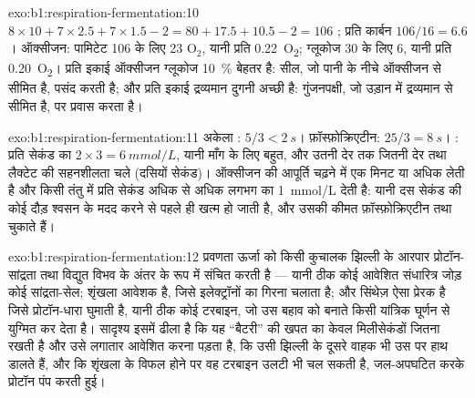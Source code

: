 \begin{solution}{exo:b1:respiration-fermentation:10}
$8\times 10 + 7\times 2.5 + 7\times 1.5 - 2 = 80 + 17.5 + 10.5 - 2 =
106$ ; प्रति कार्बन $106/16 = 6.6$। ऑक्सीजन: पामिटेट 106  के लिए 23
$\mathrm{O_2}$, यानी प्रति  \qty{0.22}{O_2}; ग्लूकोज 30 के लिए 6,
यानी प्रति  \qty{0.20}{O_2}। प्रति इकाई ऑक्सीजन ग्लूकोज \qty{10}{\%}
बेहतर है: सील, जो पानी के नीचे ऑक्सीजन से सीमित है,  पसंद
करती है; और प्रति इकाई द्रव्यमान  दुगनी अच्छी है: गुंजनपक्षी, जो
उड़ान में द्रव्यमान से सीमित है,  पर प्रवास करता है।
\end{solution}

\begin{solution}{exo:b1:respiration-fermentation:11}
अकेला : $5/3 < \qty{2}{s}$। फ़ॉस्फ़ोक्रिएटीन: $25/3 = \qty{8}{s}$।
: प्रति सेकंड  का $2\times 3 = \qty{6}{mmol/L}$, यानी माँग के
लिए बहुत, और उतनी देर तक जितनी देर  तथा लैक्टेट की सहनशीलता
चले (दसियों सेकंड)। ऑक्सीजन की आपूर्ति चढ़ने में एक मिनट या अधिक लेती है
और किसी तंतु में प्रति सेकंड अधिक से अधिक लगभग  का \qty{1}{mmol/L}
देती है: यानी दस सेकंड की कोई दौड़ श्वसन के मदद करने से पहले ही खत्म हो
जाती है, और उसकी कीमत फ़ॉस्फ़ोक्रिएटीन तथा  चुकाते हैं।
\end{solution}

\begin{solution}{exo:b1:respiration-fermentation:12}
प्रवणता ऊर्जा को किसी कुचालक झिल्ली के आरपार प्रोटॉन-सांद्रता तथा
विद्युत विभव के अंतर के रूप में संचित करती है --- यानी ठीक कोई
आवेशित संधारित्र जोड़ कोई सांद्रता-सेल; शृंखला आवेशक है, जिसे
इलेक्ट्रॉनों का गिरना चलाता है; और सिंथेज़ ऐसा प्रेरक है जिसे
प्रोटॉन-धारा घुमाती है, यानी ठीक कोई टरबाइन, जो उस बहाव को  बनाते किसी
यांत्रिक घूर्णन से युग्मित कर देता है। सादृश्य इसमें ढीला है कि यह
``बैटरी''  की खपत का केवल मिलीसेकंडों जितना रखती है और उसे लगातार
आवेशित करना पड़ता है, कि उसी झिल्ली के दूसरे वाहक भी उस पर हाथ डालते हैं,
और कि शृंखला के विफल होने पर वह टरबाइन उलटी भी चल सकती है,  जल-अपघटित
करके प्रोटॉन पंप करती हुई।
\end{solution}

